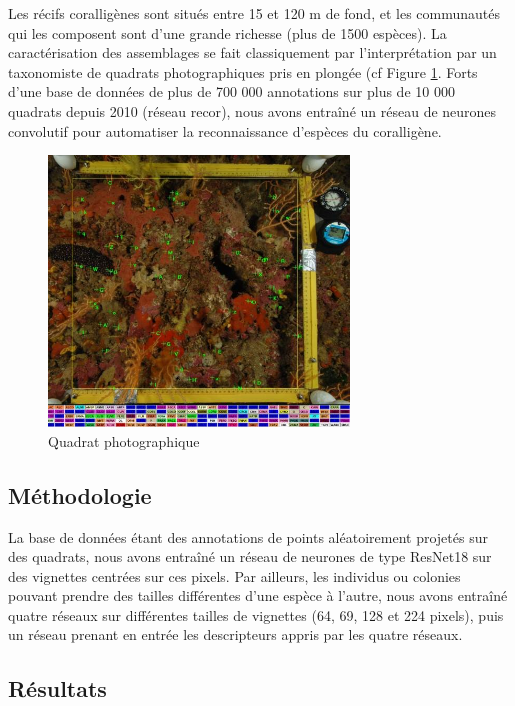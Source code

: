 Les récifs coralligènes sont situés entre 15 et 120 m de fond, et les communautés qui les composent sont d’une grande richesse (plus de 1500 espèces). La caractérisation des assemblages se fait classiquement par l’interprétation par un taxonomiste de quadrats photographiques pris en plongée (cf Figure \ref{figureB.3}. Forts d’une base de données de plus de 700 000 annotations sur plus de 10 000 quadrats depuis 2010 (réseau \acrshort{recor}), nous avons entraîné un réseau de neurones convolutif pour automatiser la reconnaissance d’espèces du coralligène.



\begin{figure}[htpb]
	\begin{center}
	\includegraphics[width=8cm]{images/appendix_merigeo/Figure3.jpg}
		\caption[]{Quadrat photographique}
	\label{figureB.3}
\end{center}
\end{figure}


\subsection*{Méthodologie}
La base de données étant des annotations de points aléatoirement projetés sur des quadrats, nous avons entraîné un réseau de neurones de type ResNet18 sur des vignettes centrées sur ces pixels. Par ailleurs, les individus ou colonies pouvant prendre des tailles différentes d’une espèce à l’autre, nous avons entraîné quatre réseaux sur différentes tailles de vignettes (64, 69, 128 et 224 pixels), puis un réseau prenant en entrée les descripteurs appris par les quatre réseaux.

\subsection*{Résultats}

